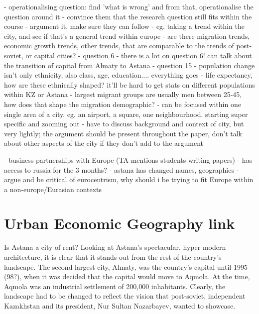 \documentclass{article}
\begin{document}
- operationalising question: find 'what is wrong' and from that, operationalise the question around it
- convince them that the research question still fits within the course - argument it, make sure they can follow
- eg. taking a trend within the city, and see if that's a general trend within europe
	- are there migration trends, economic growth trends, other trends, that are comparable to the trends of post-soviet, or capital cities?
- question 6
	- there is a lot on question 6! can talk about the transition of capital from Almaty to Astana
- question 15
	- population change isn't only ethnicity, also class, age, education.... everything goes
	- life expectancy, how are these ethnically shaped? it'll be hard to get stats on different populations within KZ or Astana
	- largest migrant groups are usually men between 25-45, how does that shape the migration demographic?
- can be focused within one single area of a city, eg. an airport, a square, one neighbourhood. starting super specific and zooming out 
- have to discuss background and context of city, but very lightly; the argument should be present throughout the paper, don't talk about other aspects of the city if they don't add to the argument

- business partnerships with Europe (TA mentions students writing papers)
- has access to russia for the 3 months? 
- astana has changed names, geographies 
- argue and be critical of eurocentrism, why should i be trying to fit Europe within a non-europe/Eurasian contexts


\section{Urban Economic Geography link}

Is Astana a city of rent? Looking at Astana's spectacular, hyper modern architecture, it is clear that it stands out from the rest of the country's landscape. The second largest city, Almaty, was the country's capital until 1995 (98?), when it was decided that the capital would move to Aqmola. At the time, Aqmola was an industrial settlement of 200,000 inhabitants. Clearly, the landscape had to be changed to reflect the vision that post-soviet, independent Kazakhstan and its president, Nur Sultan Nazarbayev, wanted to showcase. 
\end{document}
